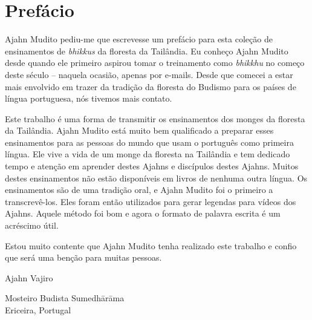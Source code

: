 
\chapter{Prefácio}

Ajahn Mudito pediu-me que escrevesse um prefácio para esta coleção
de ensinamentos de \emph{bhikkus} da floresta da Tailândia. Eu
conheço Ajahn Mudito desde quando ele primeiro aspirou tomar o
treinamento como \emph{bhikkhu} no começo deste século – naquela
ocasião, apenas por e-mails. Desde que comecei a estar mais envolvido
em trazer da tradição da floresta do Budismo para os países de língua
portuguesa, nós tivemos mais contato.

Este trabalho é uma forma de transmitir os ensinamentos dos monges
da floresta da Tailândia. Ajahn Mudito está muito bem qualificado a
preparar esses ensinamentos para as pessoas do mundo que usam o
português como primeira língua. Ele vive a vida de um monge da floresta
na Tailândia e tem dedicado tempo e atenção em aprender destes Ajahns e
discípulos destes Ajahns. Muitos destes ensinamentos não estão
disponíveis em livros de nenhuma outra língua. Os ensinamentos são de
uma tradição oral, e Ajahn Mudito foi o primeiro a transcrevê-los. Eles
foram então utilizados para gerar legendas para vídeos dos Ajahns.
Aquele método foi bom e agora o formato de palavra escrita é um
acréscimo útil.

Estou muito contente que Ajahn Mudito tenha realizado este trabalho
e confio que será uma benção para muitas pessoas.

\bigskip

{\raggedleft
Ajahn Vajiro

Mosteiro Budista Sumedhārāma\\
Ericeira, Portugal
\par}

